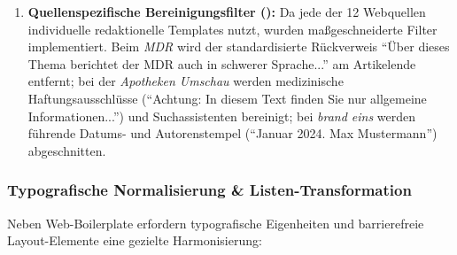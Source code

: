 \begin{enumerate}
\begin{itemize}
        \item \textit{Frageketten \& interaktive Suchwerkzeuge:} Standardisierte Teaser-Fragen und Web-Tool-Prompts (z.\,B. \enquote{Wo finde ich weitere Informationen?}, \enquote{Unser Tool durchsucht unsere Artikel}, \enquote{Ihre Frage wird nicht gespeichert}).
        \item \textit{Disclaimer \& Link-Warnungen:} Hinweistexte beim Verlassen geschützter Sprachbereiche (z.\,B. \enquote{Achtung: Dieser Link führt aus unserem Einfache-Sprache-Angebot heraus. Die Informationen sind dann nicht mehr in Leichter Sprache}).
        \item \textit{Credits, Übersetzer- \& Prüfstellennachweise:} Signaturen von Übersetzungsbüros, Prüfgruppen und Illustratorinnen (z.\,B. \enquote{Forschungsstelle Leichte Sprache}, \enquote{Büro für Leichte Sprache}, \enquote{Stefan Albers}, \enquote{European Easy-to-Read Logo}, \enquote{Inclusion Europe}).
        \item \textit{Kicker- \& Dachzeilen-Präfixe:} Führende Rubriken und Ortsmarken am Textanfang (z.\,B. \enquote{Sachsen-Anhalt:}, \enquote{Mitteldeutschland:}, \enquote{in Leichter Sprache Ticker:}, \enquote{Glossar:}).
        \item \textit{Regionale \& Layout-Artefakte:} Technische und bildbezogene Floskeln (z.\,B. \enquote{Icon für die Mobilversion}, \enquote{Von der Straße aus fotografiert}, \enquote{MEHR ANZEIGEN}).
    \end{itemize}
    \item \textbf{Quellenspezifische Bereinigungsfilter ():} Da jede der 12 Webquellen individuelle redaktionelle Templates nutzt, wurden maßgeschneiderte Filter implementiert. Beim \textit{MDR} wird der standardisierte Rückverweis \enquote{Über dieses Thema berichtet der MDR auch in schwerer Sprache...} am Artikelende entfernt; bei der \textit{Apotheken Umschau} werden medizinische Haftungsausschlüsse (\enquote{Achtung: In diesem Text finden Sie nur allgemeine Informationen...}) und Suchassistenten bereinigt; bei \textit{brand eins} werden führende Datums- und Autorenstempel (\enquote{Januar 2024. Max Mustermann}) abgeschnitten.
\end{enumerate}

\subsubsection{Typografische Normalisierung \& Listen-Transformation}
Neben Web-Boilerplate erfordern typografische Eigenheiten und barrierefreie Layout-Elemente eine gezielte Harmonisierung:

